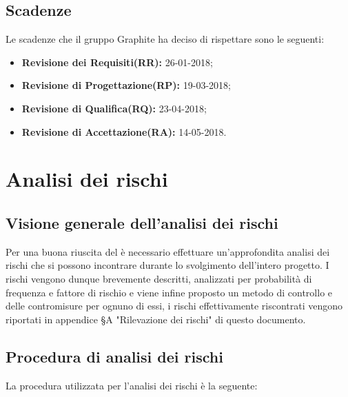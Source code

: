 \documentclass[../PianodiProgetto.tex]{subfiles}
\begin{document}
	\section{Scadenze}
	Le scadenze che il gruppo Graphite ha deciso di rispettare sono le seguenti:
	\begin{itemize}
		\item \textbf{Revisione dei Requisiti(RR):} 26-01-2018;
		\item \textbf{Revisione di Progettazione(RP):} 19-03-2018;
		\item \textbf{Revisione di Qualifica(RQ):} 23-04-2018;
		\item \textbf{Revisione di Accettazione(RA):} 14-05-2018.
	\end{itemize}
	
	\chapter{Analisi dei rischi}
	
	\section{Visione generale dell'analisi dei rischi}
	
	Per una buona riuscita del  è necessario effettuare un'approfondita analisi dei rischi che si possono incontrare durante lo svolgimento dell'intero progetto. I rischi vengono dunque brevemente descritti, analizzati per probabilità di frequenza e fattore di rischio e viene infine proposto un metodo di controllo e delle contromisure per ognuno di essi, i rischi effettivamente riscontrati vengono riportati in appendice §A "Rilevazione dei rischi" di questo documento.
	
	\section{Procedura di analisi dei rischi}
	
	La procedura utilizzata per l'analisi dei rischi è la seguente:
	
\end{document}

